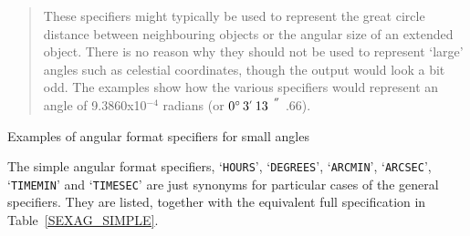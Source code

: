\documentclass[11pt,twoside]{starlink}
\providecommand{\arcsec} {$\hspace{-0.05em}\raisebox{-0.5ex}
                     {$^{'\hspace{-0.1em}'}$}
                     \hspace{-0.7em}.\hspace{-0.05em}$}
\providecommand{\dms}[4] {$#1^{\circ}\,#2\raisebox{-0.5ex}{$^{'}$}\,#3\arcsec#4$}
\begin{document}
\begin{table}[htbp]
\begin{center}
\begin{quote}
These specifiers might typically be used to represent the great circle
distance between neighbouring objects or the angular size of an extended
object.  There is no reason why they should not be used to represent
`large' angles such as celestial coordinates, though the output would
look a bit odd.  The examples show how the various specifiers would
represent an angle of 9.3860x10$^{-4}$ radians (or \dms{0}{3}{13}{66}).
\end{quote}

\caption{\label{SMALL_EXAM}Examples of angular format specifiers for
small angles}
\end{center}

\end{table}

The simple angular format specifiers, `\texttt{HOURS}', `\texttt{DEGREES}',
`\texttt{ARCMIN}', `\texttt{ARCSEC}', `\texttt{TIMEMIN}' and `\texttt{TIMESEC}'
are just synonyms for particular cases of the
general specifiers. They are listed, together with the
equivalent full specification in Table~\ref{SEXAG_SIMPLE}.
\end{document}
